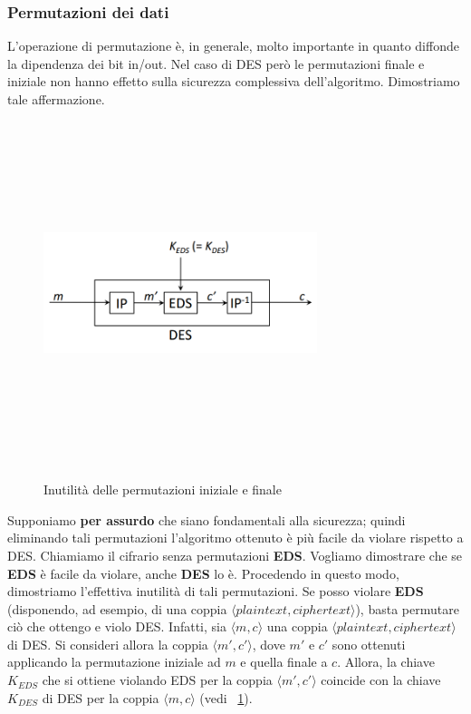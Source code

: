 \subsubsection{Permutazioni dei dati}
L'operazione di permutazione è, in generale, molto importante in quanto diffonde la dipendenza dei bit in/out. Nel caso di DES però le permutazioni finale e iniziale non hanno effetto sulla sicurezza complessiva dell'algoritmo. Dimostriamo tale affermazione. \newline \newline
\begin{figure}[htbp]
	\centering%
	\subfigure%
	{\includegraphics[height=10cm, width=8cm, keepaspectratio]{Immagini/chiave_segreta/des_perm_3.png}}
	\caption{Inutilità delle permutazioni iniziale e finale \label{fig:des_perm_3}} 	
\end{figure}

Supponiamo \textbf{per assurdo} che siano fondamentali alla sicurezza; quindi eliminando tali permutazioni l'algoritmo ottenuto è più facile da violare rispetto a DES. Chiamiamo il cifrario senza permutazioni \textbf{EDS}. Vogliamo dimostrare che se \textbf{EDS} è facile da violare, anche \textbf{DES} lo è. Procedendo in questo modo, dimostriamo l'effettiva inutilità di tali permutazioni.\newline \newline
Se posso violare \textbf{EDS} (disponendo, ad esempio, di una coppia $\langle plaintext, ciphertext \rangle$), basta permutare ciò che ottengo e violo DES. Infatti, sia $\langle m, c \rangle$ una coppia $\langle plaintext, ciphertext \rangle$ di DES. Si consideri allora la coppia $\langle m', c' \rangle$, dove $m'$ e $c'$ sono ottenuti applicando la permutazione iniziale ad $m$ e quella finale a $c$. Allora, la chiave $K_{EDS}$ che si ottiene violando EDS per la
coppia $\langle m', c' \rangle$ coincide con la chiave $K_{DES}$ di DES per la
coppia $\langle m, c \rangle$ (vedi \figurename ~\ref{fig:des_perm_3}). \\

